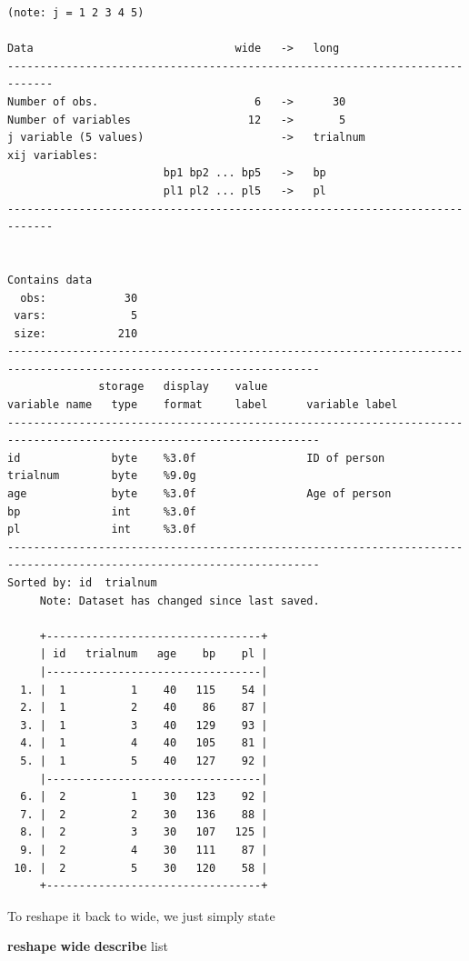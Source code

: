 \documentclass[
]{book}
\newenvironment{Shaded}{\begin{snugshade}}{\end{snugshade}}
\newcommand{\KeywordTok}[1]{\textcolor[rgb]{0.13,0.29,0.53}{\textbf{#1}}}
\newcommand{\OtherTok}[1]{\textcolor[rgb]{0.56,0.35,0.01}{#1}}
\begin{document}
\begin{verbatim}
(note: j = 1 2 3 4 5)

Data                               wide   ->   long
-----------------------------------------------------------------------------
Number of obs.                        6   ->      30
Number of variables                  12   ->       5
j variable (5 values)                     ->   trialnum
xij variables:
                        bp1 bp2 ... bp5   ->   bp
                        pl1 pl2 ... pl5   ->   pl
-----------------------------------------------------------------------------


Contains data
  obs:            30                          
 vars:             5                          
 size:           210                          
----------------------------------------------------------------------------------------------------------------------
              storage   display    value
variable name   type    format     label      variable label
----------------------------------------------------------------------------------------------------------------------
id              byte    %3.0f                 ID of person
trialnum        byte    %9.0g                 
age             byte    %3.0f                 Age of person
bp              int     %3.0f                 
pl              int     %3.0f                 
----------------------------------------------------------------------------------------------------------------------
Sorted by: id  trialnum
     Note: Dataset has changed since last saved.

     +---------------------------------+
     | id   trialnum   age    bp    pl |
     |---------------------------------|
  1. |  1          1    40   115    54 |
  2. |  1          2    40    86    87 |
  3. |  1          3    40   129    93 |
  4. |  1          4    40   105    81 |
  5. |  1          5    40   127    92 |
     |---------------------------------|
  6. |  2          1    30   123    92 |
  7. |  2          2    30   136    88 |
  8. |  2          3    30   107   125 |
  9. |  2          4    30   111    87 |
 10. |  2          5    30   120    58 |
     +---------------------------------+
\end{verbatim}

To reshape it back to wide, we just simply state

\begin{Shaded}
\begin{Highlighting}[]
\KeywordTok{reshape} \KeywordTok{wide}
\KeywordTok{describe}
\OtherTok{list}
\end{Highlighting}
\end{Shaded}
\end{document}
